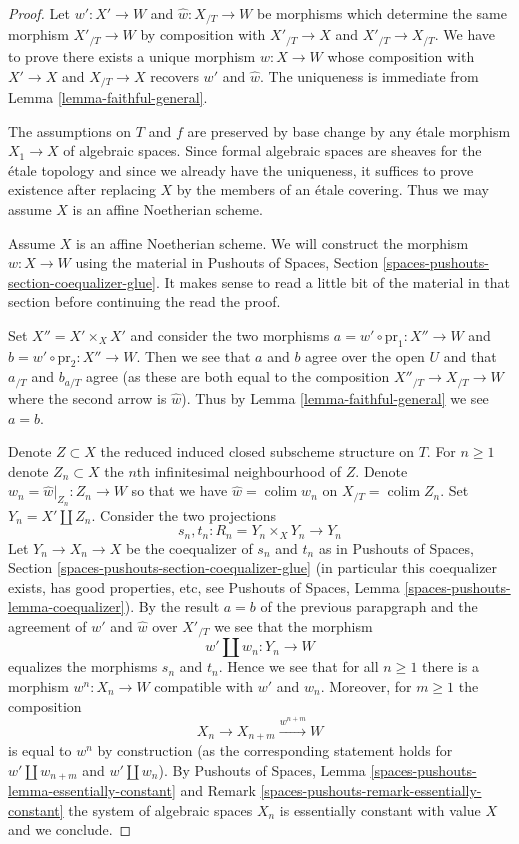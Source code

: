 \documentclass{stacks-project}
\theoremstyle{plain}
\theoremstyle{definition}
\theoremstyle{remark}
\numberwithin{equation}{subsection}
\def\colim{\mathop{\mathrm{colim}}\nolimits}
\begin{document}
\begin{proof}
Let $w' : X' \to W$ and $\hat w : X_{/T} \to W$ be morphisms
which determine the same morphism $X'_{/T} \to W$ by composition
with $X'_{/T} \to X$ and $X'_{/T} \to X_{/T}$. We have to prove
there exists a unique morphism $w : X \to W$ whose composition
with $X' \to X$ and $X_{/T} \to X$ recovers $w'$ and $\hat w$.
The uniqueness is immediate from Lemma \ref{lemma-faithful-general}.

\medskip\noindent
The assumptions on $T$ and $f$ are preserved by base change
by any \'etale morphism $X_1 \to X$ of algebraic spaces.
Since formal algebraic spaces are sheaves for the
\'etale topology and since we already have the uniqueness,
it suffices to prove existence after replacing $X$ by
the members of an \'etale covering. Thus we may assume $X$ is
an affine Noetherian scheme.

\medskip\noindent
Assume $X$ is an affine Noetherian scheme. We will construct
the morphism $w : X \to W$ using the material in
Pushouts of Spaces, Section \ref{spaces-pushouts-section-coequalizer-glue}.
It makes sense to read a little bit of the material
in that section before continuing the read the proof.

\medskip\noindent
Set $X'' = X' \times_X X'$ and consider the two morphisms
$a = w' \circ \text{pr}_1 : X'' \to W$ and 
$b = w' \circ \text{pr}_2 : X'' \to W$.
Then we see that $a$ and $b$ agree over the open $U$
and that $a_{/T}$ and $b_{a/T}$ agree (as these are
both equal to the composition $X''_{/T} \to X_{/T} \to W$
where the second arrow is $\hat w$).
Thus by Lemma \ref{lemma-faithful-general}
we see $a = b$.

\medskip\noindent
Denote $Z \subset X$ the reduced induced closed subscheme structure
on $T$. For $n \geq 1$ denote $Z_n \subset X$ the $n$th infinitesimal
neighbourhood of $Z$. Denote $w_n = \hat w|_{Z_n} : Z_n \to W$
so that we have $\hat w = \colim w_n$ on $X_{/T} = \colim Z_n$.
Set $Y_n = X' \amalg Z_n$. Consider the two projections
$$
s_n, t_n : R_n = Y_n \times_X Y_n \longrightarrow Y_n
$$
Let $Y_n \to X_n \to X$ be the coequalizer of $s_n$ and $t_n$ as in
Pushouts of Spaces, Section \ref{spaces-pushouts-section-coequalizer-glue}
(in particular this coequalizer exists, has good properties, etc, see
Pushouts of Spaces, Lemma \ref{spaces-pushouts-lemma-coequalizer}).
By the result $a = b$ of the previous parapgraph and the agreement
of $w'$ and $\hat w$ over $X'_{/T}$ we see that the morphism
$$
w' \amalg w_n : Y_n \longrightarrow W
$$
equalizes the morphisms $s_n$ and $t_n$. Hence we see that for all $n \geq 1$
there is a morphism $w^n : X_n \to W$ compatible with $w'$ and $w_n$.
Moreover, for $m \geq 1$ the composition
$$
X_n \to X_{n + m} \xrightarrow{w^{n + m}} W
$$
is equal to $w^n$ by construction (as the corresponding statement holds
for $w' \amalg w_{n + m}$ and $w' \amalg w_n$). By
Pushouts of Spaces, Lemma
\ref{spaces-pushouts-lemma-essentially-constant} and
Remark \ref{spaces-pushouts-remark-essentially-constant}
the system of algebraic spaces $X_n$ is essentially constant
with value $X$ and we conclude.
\end{proof}
\end{document}
